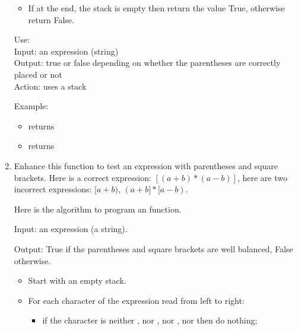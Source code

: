 \documentclass[11pt,class=report,crop=false]{standalone}
\begin{document}
\begin{activite}
\begin{enumerate}
\begin{algorithme}
\begin{itemize}
   \item If at the end, the stack is empty then return the value \og{}True\fg{}, otherwise return \og{}False\fg{}.
   
 \end{itemize}  
   \end{algorithme}


\begin{fonction}
  Use:  \\
  Input: an expression (string) \\
  Output: true or false depending on whether the parentheses are correctly placed or not \\
  Action: uses a stack
   
  \medskip
   
  Example: 
  \begin{itemize}
    \item {} returns 
    \item {} returns 
    \end{itemize}    
\end{fonction}  
  
  
\item Enhance this function to test an expression with parentheses and square brackets.
Here is a correct expression: $[(a+b)*(a-b)]$, here are two incorrect expressions:
$[a+b)$, $(a+b]*[a-b)$.

Here is the algorithm to program an  function.


  \begin{algorithme}
  Input: an expression (a string). 

  Output: \og{}True\fg{} if the parentheses and square brackets are well balanced, \og{}False\fg{} otherwise.     

  \begin{itemize}

  \item Start with an empty stack.   
   
   \item For each character of the expression read from left to right:
   \begin{itemize}
     \item if the character is neither , nor , nor \ci{"["}, nor \ci{"]"} then do nothing;
     

\end{itemize}
\end{itemize}
\end{algorithme}
\end{enumerate}
\end{activite}
\end{document}

